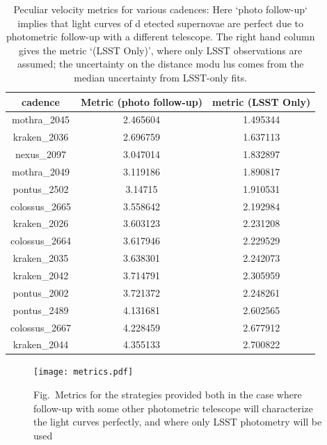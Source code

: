 \documentclass[a4paper,10pt]{article}
\begin{document}
\begin{table}
\begin{center}
\begin{tabular}{|c|c|c|}
    \hline
     cadence &  Metric (photo follow-up) &  metric (LSST Only) \\
     \hline
    mothra\_2045 & 2.465604 & 1.495344  \\
	kraken\_2036 & 2.696759 & 1.637113  \\
	nexus\_2097 & 3.047014 & 1.832897  \\
	mothra\_2049 & 3.119186 & 1.890817  \\
	pontus\_2502 & 3.14715 & 1.910531  \\
	colossus\_2665 & 3.558642 & 2.192984  \\
	kraken\_2026 & 3.603123 & 2.231208  \\
	colossus\_2664 & 3.617946 & 2.229529  \\	
	kraken\_2035 & 3.638301 & 2.242073  \\
	kraken\_2042 & 3.714791 & 2.305959  \\
	pontus\_2002 & 3.721372 & 2.248261  \\
	pontus\_2489 & 4.131681 & 2.602565  \\
	colossus\_2667 & 4.228459 & 2.677912  \\
	kraken\_2044 & 4.355133 & 2.700822  \\
     \hline
\end{tabular}
\end{center}
\caption{Peculiar velocity metrics for various cadences: Here `photo follow-up` implies that light curves of d
etected supernovae are perfect due to photometric follow-up with a different telescope. The right hand column 
gives the metric `(LSST Only)', where only LSST observations are assumed; the uncertainty on the distance modu
lus comes from the median uncertainty from LSST-only fits.}
\label{tab:cadence_metrics}
\end{table}

\begin{figure}
    \begin{center}
        \texttt{[image: metrics.pdf]}
        \caption{Fig.~Metrics for the strategies provided both in the case where follow-up with some other photometric telescope will characterize the light curves perfectly, and where only LSST photometry will be used}
    \label{fig:cadence_metrics}
    \end{center}
\end{figure}
\end{document}
